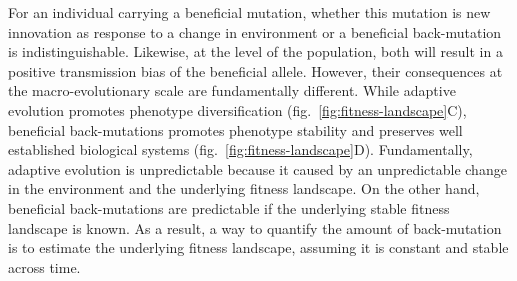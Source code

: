 \documentclass{article}
\begin{document}
    For an individual carrying a beneficial mutation, whether this mutation is new innovation as response to a change in environment or a beneficial back-mutation is indistinguishable.
    Likewise, at the level of the population, both will result in a positive transmission bias of the beneficial allele.
    However, their consequences at the macro-evolutionary scale are fundamentally different.
    While adaptive evolution promotes phenotype diversification (fig.~\ref{fig:fitness-landscape}C), beneficial back-mutations promotes phenotype stability and preserves well established biological systems (fig.~\ref{fig:fitness-landscape}D).
    Fundamentally, adaptive evolution is unpredictable because it caused by an unpredictable change in the environment and the underlying fitness landscape\cite{bazykin_changing_2015}.
    On the other hand, beneficial back-mutations are predictable if the underlying stable fitness landscape is known.
    As a result, a way to quantify the amount of back-mutation is to estimate the underlying fitness landscape, assuming it is constant and stable across time.
\end{document}
